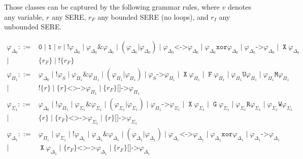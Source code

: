 \documentclass[a4paper,twoside,10pt,DIV=12]{scrreprt}
\DeclareMathOperator{\F}{\texttt{F}}
\DeclareMathOperator{\G}{\texttt{G}}
\newcommand{\U}{\mathbin{\texttt{U}}}
\newcommand{\R}{\mathbin{\texttt{R}}}
\DeclareMathOperator{\X}{\texttt{X}}
\newcommand{\M}{\mathbin{\texttt{M}}}
\newcommand{\W}{\mathbin{\texttt{W}}}
\DeclareMathOperator{\NOT}{\texttt{!}}
\newcommand{\XOR}{\mathbin{\texttt{xor}}}
\newcommand{\IMPLIES}{\mathbin{\texttt{->}}}
\newcommand{\EQUIV}{\mathbin{\texttt{<->}}}
\newcommand{\OR}{\mathbin{\texttt{|}}}
\newcommand{\AND}{\mathbin{\texttt{\&}}}
\newcommand{\0}{\texttt{0}}
\newcommand{\1}{\texttt{1}}
\newcommand{\Esuffix}{\texttt{<>->}}
\newcommand{\Asuffix}{\texttt{[]->}}
\newcommand{\sere}[1]{\texttt{\{}#1\texttt{\}}}
\newcommand{\nsere}[1]{\texttt{!\{}#1\texttt{\}}}
\begin{document}
Those classes can be captured by the following grammar rules, where
$v$ denotes any variable, $r$ any SERE, $r_F$ any bounded SERE (no
loops), and $r_I$ any unbounded SERE.

\begin{align*}
  \varphi_{\Delta_0} ::={}& \0\mid\1\mid v\mid\NOT\varphi_{\Delta_0}\mid\varphi_{\Delta_0}\AND\varphi_{\Delta_0}
                   \mid(\varphi_{\Delta_0}\OR\varphi_{\Delta_0})\mid\varphi_{\Delta_0}\EQUIV\varphi_{\Delta_0}
                   \mid\varphi_{\Delta_0}\XOR\varphi_{\Delta_0}\mid\varphi_{\Delta_0}\IMPLIES\varphi_{\Delta_0}
                   \mid\X\varphi_{\Delta_0}\\
               \mid{}& \sere{r_F}\mid \nsere{r_F}\\
  \varphi_{\Pi_1} ::={}& \varphi_{\Delta_0}\mid \NOT\varphi_S\mid
                   \varphi_{\Pi_1}\AND \varphi_{\Pi_1}\mid (\varphi_{\Pi_1}\OR \varphi_{\Pi_1})
                   \mid\varphi_S\IMPLIES\varphi_{\Pi_1}\mid
                   \X\varphi_{\Pi_1} \mid \F\varphi_{\Pi_1}\mid
                   \varphi_{\Pi_1}\U\varphi_{\Pi_1}\mid \varphi_{\Pi_1}\M\varphi_{\Pi_1}\\
           \mid{}& \nsere{r}\mid
                   \sere{r}\Esuffix \varphi_{\Pi_1}\mid
                   \sere{r_F}\Asuffix \varphi_{\Pi_1} \\
  \varphi_{\Sigma_1} ::={}& \varphi_{\Delta_0}\mid \NOT\varphi_{\Pi_1}\mid
                   \varphi_{\Sigma_1}\AND \varphi_{\Sigma_1}\mid (\varphi_{\Sigma_1}\OR \varphi_{\Sigma_1})
                   \mid\varphi_{\Pi_1}\IMPLIES\varphi_{\Sigma_1}\mid
                   \X\varphi_{\Sigma_1} \mid \G\varphi_{\Sigma_1}\mid
                   \varphi_{\Sigma_1}\R\varphi_{\Sigma_1}\mid \varphi_{\Sigma_1}\W\varphi_{\Sigma_1}\\
           \mid{}& \sere{r}\mid
                   \sere{r_F}\Esuffix \varphi_{\Sigma_1}\mid
                   \sere{r}\Asuffix \varphi_{\Sigma_1}\\
  \varphi_{\Delta_1} ::={}& \varphi_{\Pi_1} \mid \varphi_{\Sigma_1}\mid \NOT\varphi_{\Delta_1}\mid
                   \varphi_{\Delta_1}\AND \varphi_{\Delta_1}\mid (\varphi_{\Delta_1}\OR \varphi_{\Delta_1})\mid
                   \varphi_{\Delta_1}\EQUIV \varphi_{\Delta_1}\mid \varphi_{\Delta_1}\XOR \varphi_{\Delta_1}\mid
                   \varphi_{\Delta_1}\IMPLIES \varphi_{\Delta_1}\\
           \mid{}& \X\varphi_{\Delta_1} \mid{}
                   \sere{r_F}\Esuffix \varphi_{\Delta_1} \mid
                   \sere{r_F}\Asuffix \varphi_{\Delta_1}\\

\end{align*}
\end{document}
